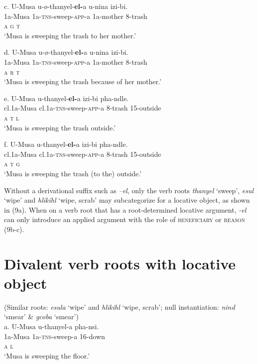 \gll   c.  U-Musa    u-ø-thanyel-\textbf{el-}a         u-nina         izi-bi. \\
         1a-Musa     1a-\textsc{tns}{}-sweep-\textsc{app}{}-a  1a-mother   8-trash\\
         \textsc{a                  g        t}\\
\glt     ‘Musa is sweeping the trash to her mother.’
\z

\gll   d.  U-Musa    u-ø-thanyel-\textbf{el-}a         u-nina        izi-bi. \\
         1a-Musa     1a-\textsc{tns}{}-sweep-\textsc{app}{}-a  1a-mother  8-trash\\
         \textsc{a                  r        t}\\
\glt     ‘Musa is sweeping the trash because of her mother.’
\z

\gll   e.  U-Musa        u-thanyel-\textbf{el-}a        izi-bi       pha-ndle. \\
         cl.1a-Musa     cl.1a-\textsc{tns}{}-sweep-\textsc{app}{}-a    8-trash       15-outside\\
         \textsc{a                      t      l}\\
\glt     ‘Musa is sweeping the trash outside.’
\z

\gll   f.  U-Musa     u-thanyel-\textbf{el-}a           izi-bi      pha-ndle. \\
         cl.1a-Musa     cl.1a-\textsc{tns}{}-sweep-\textsc{app}{}-a       8-trash    15-outside\\
         \textsc{a                      t      g}\\
\glt     ‘Musa is sweeping the trash (to the) outside.’
\z

Without a derivational suffix such as \textit{–el}, only the verb roots \textit{thanyel} ‘sweep’, \textit{esul} ‘wipe’ and \textit{hlikihl} ‘wipe, scrab’ may subcategorize for a locative object, as shown in (9a). When on a verb root that has a root-determined locative argument, \textit{{}-el} can only introduce an applied argument with the role of \textsc{beneficiary} or \textsc{reason}\textit{ }(9b-c). 

\chapter{Divalent verb roots with locative object }
       (Similar roots: \textit{esula} ‘wipe’ and \textit{hlikihl} ‘wipe, scrab’; null instantiation: \textit{nind} ‘smear’ \& \textit{gcoba} ‘smear’)\\
\gll   a.  U-Musa    u-thanyel-a           pha-nsi. \\
         1a-Musa     1a-\textsc{tns}{}-sweep-a  16-down\\
         \textsc{a                l}\\
\glt     ‘Musa is sweeping the floor.’
\z

